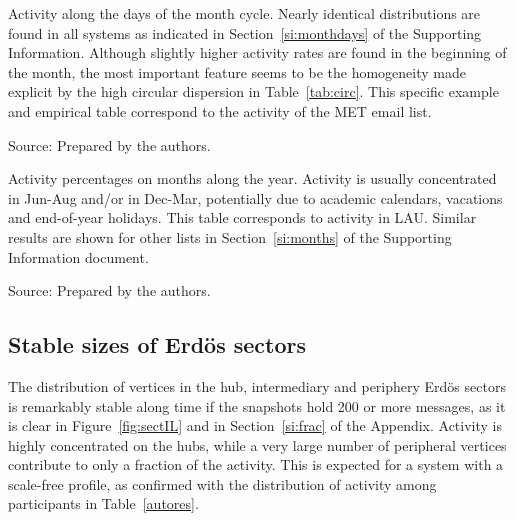 \FloatBarrier

\begin{table}
\caption{Activity along the days of the month cycle.
Nearly identical distributions are found in all systems
as indicated in Section~\ref*{si:monthdays} of the Supporting Information. Although slightly higher activity rates are found in the beginning of the month, the most important feature seems to be the homogeneity made explicit by the high circular dispersion in Table~\ref{tab:circ}.
This specific example and empirical table correspond to the activity of the MET email list.}
\footnotesize

\label{tab:min}
\begin{flushleft}
		Source: Prepared by the authors.\
\end{flushleft}
\end{table}

\begin{table}
\caption{Activity percentages on months along the year. 	Activity is usually concentrated in Jun-Aug and/or in Dec-Mar, potentially due to academic calendars, vacations and end-of-year holidays. This table corresponds to activity in LAU. Similar results are shown for other lists in Section~\ref*{si:months} of the Supporting Information document.}
\footnotesize

\label{tab:min22}
\begin{flushleft}
		Source: Prepared by the authors.\
\end{flushleft}
\end{table}


\subsection{Stable sizes of Erd\"os sectors}\label{subsec:pih}

The distribution of vertices in the hub, intermediary and periphery Erd\"os sectors is remarkably stable along time if the snapshots hold 200 or more messages,
as it is clear in Figure~\ref{fig:sectIL} and in Section~\ref{si:frac} of the Appendix. 
Activity is highly concentrated on the hubs, while a very large number of peripheral vertices contribute to only a fraction of the activity.
This is expected for a system with a scale-free profile, as confirmed with the distribution of activity among participants in Table~\ref{autores}.

